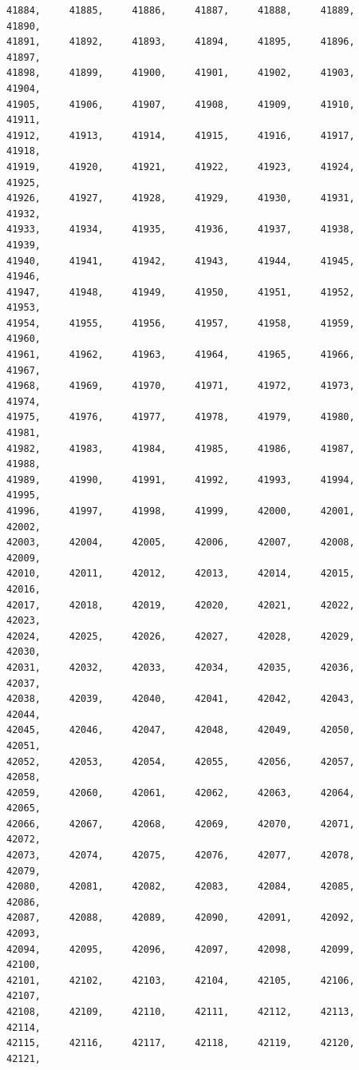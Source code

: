 \documentclass[a4paper,11pt]{report}
\begin{document}
\begin{verbatim}
41884,     41885,     41886,     41887,     41888,     41889,     41890,     
41891,     41892,     41893,     41894,     41895,     41896,     41897,     
41898,     41899,     41900,     41901,     41902,     41903,     41904,     
41905,     41906,     41907,     41908,     41909,     41910,     41911,     
41912,     41913,     41914,     41915,     41916,     41917,     41918,     
41919,     41920,     41921,     41922,     41923,     41924,     41925,     
41926,     41927,     41928,     41929,     41930,     41931,     41932,     
41933,     41934,     41935,     41936,     41937,     41938,     41939,     
41940,     41941,     41942,     41943,     41944,     41945,     41946,     
41947,     41948,     41949,     41950,     41951,     41952,     41953,     
41954,     41955,     41956,     41957,     41958,     41959,     41960,     
41961,     41962,     41963,     41964,     41965,     41966,     41967,     
41968,     41969,     41970,     41971,     41972,     41973,     41974,     
41975,     41976,     41977,     41978,     41979,     41980,     41981,     
41982,     41983,     41984,     41985,     41986,     41987,     41988,     
41989,     41990,     41991,     41992,     41993,     41994,     41995,     
41996,     41997,     41998,     41999,     42000,     42001,     42002,     
42003,     42004,     42005,     42006,     42007,     42008,     42009,     
42010,     42011,     42012,     42013,     42014,     42015,     42016,     
42017,     42018,     42019,     42020,     42021,     42022,     42023,     
42024,     42025,     42026,     42027,     42028,     42029,     42030,     
42031,     42032,     42033,     42034,     42035,     42036,     42037,     
42038,     42039,     42040,     42041,     42042,     42043,     42044,     
42045,     42046,     42047,     42048,     42049,     42050,     42051,     
42052,     42053,     42054,     42055,     42056,     42057,     42058,     
42059,     42060,     42061,     42062,     42063,     42064,     42065,     
42066,     42067,     42068,     42069,     42070,     42071,     42072,     
42073,     42074,     42075,     42076,     42077,     42078,     42079,     
42080,     42081,     42082,     42083,     42084,     42085,     42086,     
42087,     42088,     42089,     42090,     42091,     42092,     42093,     
42094,     42095,     42096,     42097,     42098,     42099,     42100,     
42101,     42102,     42103,     42104,     42105,     42106,     42107,     
42108,     42109,     42110,     42111,     42112,     42113,     42114,     
42115,     42116,     42117,     42118,     42119,     42120,     42121,     

\end{verbatim}
\end{document}
